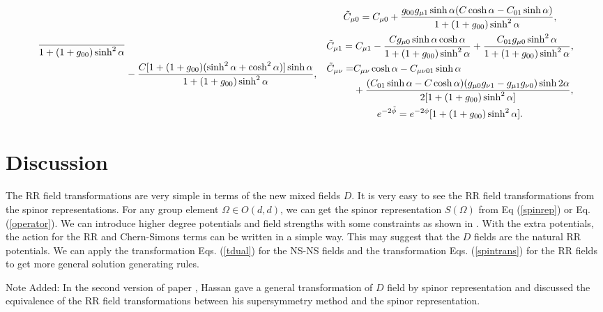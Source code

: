 \documentclass[a4paper,12pt]{article}
\begin{document}
\begin{subequations}
\begin{gather}
\begin{split}
{\over 1+(1+g_{00})\sinh^2\alpha}\\
&-{C[1+(1+g_{00})(\sinh^2\alpha+\cosh^2\alpha)]\sinh\alpha
\over 1+(1+g_{00})\sinh^2\alpha},
\end{split}
\end{gather}
\begin{gather}
\label{ctransfd}
{\tilde C}_{\mu 0}=C_{\mu 0}+{g_{00}g_{\mu 1}\sinh\alpha
(C \cosh\alpha -C_{01}\sinh\alpha)\over
1+(1+g_{00})\sinh^2\alpha},\\
\label{ctransfe}
{\tilde C}_{\mu 1}=C_{\mu 1}-{C g_{\mu 0}
\sinh\alpha\cosh\alpha\over 
1+(1+g_{00})\sinh^2\alpha}
+{C_{01}g_{\mu 0}\sinh^2\alpha\over 
1+(1+g_{00})\sinh^2\alpha},\\
\label{ctransff}
\begin{split}
{\tilde C}_{\mu\nu}=& C_{\mu\nu}\cosh\alpha
-C_{\mu\nu 01}\sinh\alpha\\
&+{(C_{01}\sinh\alpha-C\cosh\alpha)(g_{\mu 0}g_{\nu 1}
-g_{\mu 1}g_{\nu 0})\sinh 2\alpha\over
2[1+(1+g_{00})\sinh^2\alpha]},
\end{split}\\
\label{phitransfa}
e^{-2{\tilde \phi}}=e^{-2\phi}[1+(1+g_{00})\sinh^2\alpha].
\end{gather}
\end{subequations}

\section{Discussion}

The RR field transformations are very simple in terms
of the new mixed fields $D$. It is very easy to
see the RR field transformations from the spinor
representations. 
For any group element $\Omega\in O(d,d)$, we can
get the spinor representation $S(\Omega)$ from
Eq (\ref{spinrep}) or Eq. (\ref{operator}).
We can introduce higher degree
potentials and field strengths with some constraints
as shown in \cite{fukuma99}. With the extra potentials,
the action for the RR and Chern-Simons terms
can be written in a simple way. This may suggest
that the $D$ fields are the natural RR potentials.
We can apply the transformation Eqs. (\ref{tdual}) for the
NS-NS fields and the transformation Eqs. (\ref{spintrans})
for the RR fields to get more general solution generating
rules.  

\bigskip

{\noindent Note Added:} In the second version of paper
\cite{hassan99}, Hassan gave a general transformation
of $D$ field by spinor representation and discussed
the equivalence of the RR field transformations between
his supersymmetry method and the spinor representation.
\end{document}
